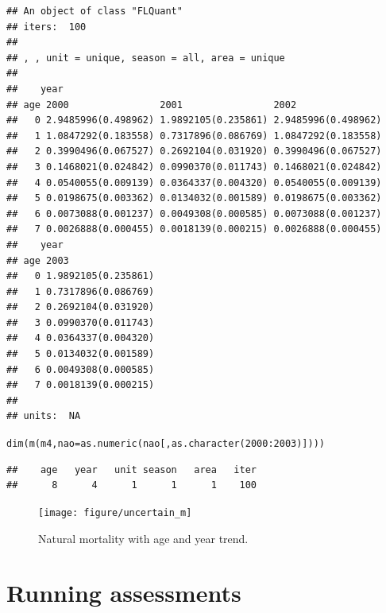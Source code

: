 \documentclass[a4paper,english,10pt]{article}\usepackage[]{graphicx}\usepackage[]{color}
\makeatletter
\newcommand{\hlnum}[1]{\textcolor[rgb]{0.2,0.2,0.2}{#1}}%
\newcommand{\hlopt}[1]{\textcolor[rgb]{0.2,0.2,0.2}{#1}}%
\newcommand{\hlstd}[1]{\textcolor[rgb]{0,0,0}{#1}}%
\newcommand{\hlkwc}[1]{\textcolor[rgb]{0.361,0.506,0.596}{#1}}%
\newcommand{\hlkwd}[1]{\textcolor[rgb]{0.361,0.506,0.596}{#1}}%
\newenvironment{kframe}{%
 \def\at@end@of@kframe{}%
 \ifinner\ifhmode%
  \def\at@end@of@kframe{\end{minipage}}%
  \begin{minipage}{\columnwidth}%
 \fi\fi%
 \def\FrameCommand##1{\hskip\@totalleftmargin \hskip-\fboxsep
 \colorbox{shadecolor}{##1}\hskip-\fboxsep
     \hskip-\linewidth \hskip-\@totalleftmargin \hskip\columnwidth}%
 \MakeFramed {\advance\hsize-\width
   \@totalleftmargin\z@ \linewidth\hsize
   \@setminipage}}%
 {\par\unskip\endMakeFramed%
 \at@end@of@kframe}
\newenvironment{knitrout}{}{} %
\makeatother
\begin{document}
\begin{knitrout}
\begin{kframe}
\begin{verbatim}
## An object of class "FLQuant"
## iters:  100 
## 
## , , unit = unique, season = all, area = unique
## 
##    year
## age 2000                2001                2002               
##   0 2.9485996(0.498962) 1.9892105(0.235861) 2.9485996(0.498962)
##   1 1.0847292(0.183558) 0.7317896(0.086769) 1.0847292(0.183558)
##   2 0.3990496(0.067527) 0.2692104(0.031920) 0.3990496(0.067527)
##   3 0.1468021(0.024842) 0.0990370(0.011743) 0.1468021(0.024842)
##   4 0.0540055(0.009139) 0.0364337(0.004320) 0.0540055(0.009139)
##   5 0.0198675(0.003362) 0.0134032(0.001589) 0.0198675(0.003362)
##   6 0.0073088(0.001237) 0.0049308(0.000585) 0.0073088(0.001237)
##   7 0.0026888(0.000455) 0.0018139(0.000215) 0.0026888(0.000455)
##    year
## age 2003               
##   0 1.9892105(0.235861)
##   1 0.7317896(0.086769)
##   2 0.2692104(0.031920)
##   3 0.0990370(0.011743)
##   4 0.0364337(0.004320)
##   5 0.0134032(0.001589)
##   6 0.0049308(0.000585)
##   7 0.0018139(0.000215)
## 
## units:  NA
\end{verbatim}
\begin{alltt}
\hlkwd{dim}\hlstd{(}\hlkwd{m}\hlstd{(m4,} \hlkwc{nao}\hlstd{=}\hlkwd{as.numeric}\hlstd{(nao[,}\hlkwd{as.character}\hlstd{(}\hlnum{2000}\hlopt{:}\hlnum{2003}\hlstd{)])))}
\end{alltt}
\begin{verbatim}
##    age   year   unit season   area   iter 
##      8      4      1      1      1    100
\end{verbatim}
\end{kframe}
\end{knitrout}

\begin{knitrout}
\color{fgcolor}\begin{figure}[H]


{\centering \texttt{[image: figure/uncertain\_m]} 

}

\caption[Natural mortality with age and year trend]{Natural mortality with age and year trend.\label{fig:uncertain_m}}
\end{figure}


\end{knitrout}

\pagebreak
\section{Running assessments}\label{sec:sca}
\end{document}
